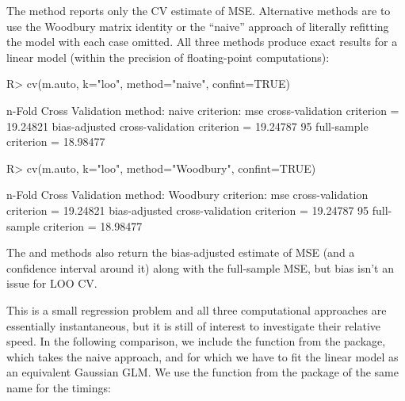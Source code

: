 \documentclass[
]{jss}
\begin{document}
The  method reports only the CV estimate of MSE.
Alternative methods are to use the Woodbury matrix identity or the
``naive'' approach of literally refitting the model with each case
omitted. All three methods produce exact results for a linear model
(within the precision of floating-point computations):

\begin{CodeChunk}
\begin{CodeInput}
R> cv(m.auto, k="loo", method="naive", confint=TRUE)
\end{CodeInput}
\begin{CodeOutput}
n-Fold Cross Validation
method: naive
criterion: mse
cross-validation criterion = 19.24821
bias-adjusted cross-validation criterion = 19.24787
95%
full-sample criterion = 18.98477 
\end{CodeOutput}
\begin{CodeInput}
R> cv(m.auto, k="loo", method="Woodbury", confint=TRUE)
\end{CodeInput}
\begin{CodeOutput}
n-Fold Cross Validation
method: Woodbury
criterion: mse
cross-validation criterion = 19.24821
bias-adjusted cross-validation criterion = 19.24787
95%
full-sample criterion = 18.98477 
\end{CodeOutput}
\end{CodeChunk}

The  and  methods also return the
bias-adjusted estimate of MSE (and a confidence interval around it)
along with the full-sample MSE, but bias isn't an issue for LOO CV.

This is a small regression problem and all three computational
approaches are essentially instantaneous, but it is still of interest to
investigate their relative speed. In the following comparison, we
include the  function from the  package, which
takes the naive approach, and for which we have to fit the linear model
as an equivalent Gaussian GLM. We use the 
function from the package of the same name \citep{Mersmann:2023} for the
timings:
\end{document}

